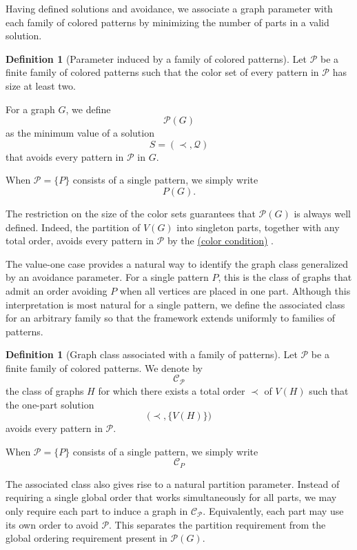 \documentclass[12pt]{article}
\theoremstyle{plain}
\theoremstyle{definition}
\newtheorem{definition}[theorem]{Definition}
\theoremstyle{remark}
\theoremstyle{definition}
\newcommand{\colorcondition}{%
  \hyperref[def:avoid:cond:color]{(color condition)}\xspace
}
\begin{document}
Having defined solutions and avoidance, we associate a graph parameter with
each family of colored patterns by minimizing the number of parts in a valid
solution.

\begin{definition}[Parameter induced by a family of colored patterns]
\label{def:avoidance-parameter}
Let \(\mathcal P\) be a finite family of colored patterns such that the
color set of every pattern in \(\mathcal P\) has size at least two.

For a graph \(G\), we define
\[
\mathcal P(G)
\]
as the minimum value of a solution
\[
S=(\prec,\mathcal Q)
\]
that avoids every pattern in \(\mathcal P\) in \(G\).

When \(\mathcal P=\{P\}\) consists of a single pattern, we simply write
\[
P(G).
\]

\end{definition}

The restriction on the size of the color sets guarantees that
\(\mathcal P(G)\) is always well defined. Indeed, the partition of \(V(G)\)
into singleton parts, together with any total order, avoids every pattern in
\(\mathcal P\) by the \colorcondition{}.

\medskip

The value-one case provides a natural way to identify the graph class
generalized by an avoidance parameter. For a single pattern \(P\), this is
the class of graphs that admit an order avoiding \(P\) when all vertices are
placed in one part. Although this interpretation is most natural for a single
pattern, we define the associated class for an arbitrary family so that the
framework extends uniformly to families of patterns.

\begin{definition}[Graph class associated with a family of patterns]
\label{def:associated-class}
Let \(\mathcal P\) be a finite family of colored patterns. We denote by
\[
\mathcal C_{\mathcal P}
\]
the class of graphs \(H\) for which there exists a total order \(\prec\) of
\(V(H)\) such that the one-part solution
\[
\bigl(\prec,\{V(H)\}\bigr)
\]
avoids every pattern in \(\mathcal P\).

When \(\mathcal P=\{P\}\) consists of a single pattern, we simply write
\[
\mathcal C_P
\]

\end{definition}

\medskip

The associated class also gives rise to a natural partition parameter.
Instead of requiring a single global order that works simultaneously for all
parts, we may only require each part to induce a graph in
\(\mathcal C_{\mathcal P}\). Equivalently, each part may use its own order
to avoid \(\mathcal P\). This separates the partition requirement from the
global ordering requirement present in \(\mathcal P(G)\).
\end{document}

